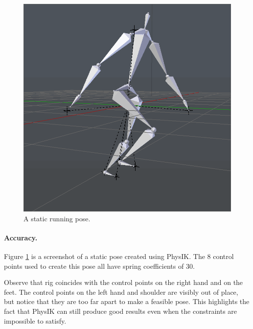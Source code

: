 \documentclass[10pt,twocolumn,letterpaper]{article}
\begin{document}
\begin{figure}[]
    \centering
    \includegraphics[width=0.7\columnwidth] {pose-frame.png}
    \caption{A static running pose.}
    \label{img:running}
\end{figure}

\paragraph{Accuracy.} Figure \ref{img:running} is a screenshot of a static pose created using PhysIK. The 8 control points used to create this pose all have spring coefficients of 30.

Observe that rig coincides with the control points on the right hand and on the feet. The control points on the left hand and shoulder are visibly out of place, but notice that they are too far apart to make a feasible pose. This highlights the fact that PhysIK can still produce good results even when the constraints are impossible to satisfy. 
\end{document}
